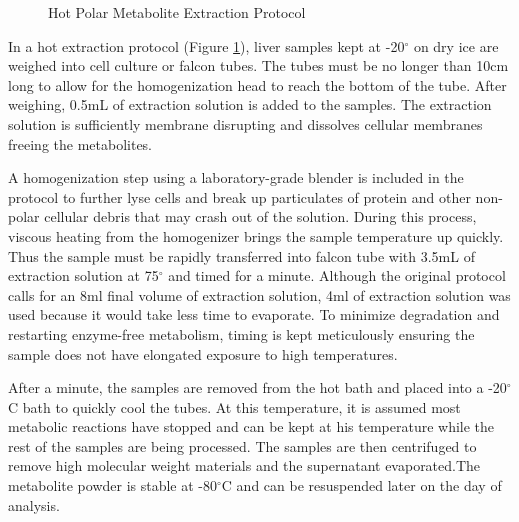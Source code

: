 \documentclass[a4paper,11pt,twoside]{book}
\begin{document}
	\begin{figure}[b!ht]
		\centering
		\caption{Hot Polar Metabolite Extraction Protocol}
		\label{fig:Hot Extraction Protocol}
	\end{figure}
	
	
	In a hot extraction protocol (Figure \ref{fig:Hot Extraction Protocol}), liver samples kept at -20$^{\circ}$ on dry ice are weighed into cell culture or falcon tubes. The tubes must be no longer than 10cm long to allow for the homogenization head to reach the bottom of the tube. After weighing, 0.5mL of extraction solution is added to the samples. The extraction solution is sufficiently membrane disrupting and dissolves cellular membranes freeing the metabolites. 
	
	A homogenization step using a laboratory-grade blender is included in the protocol to further lyse cells and break up particulates of protein and other non-polar cellular debris that may crash out of the solution. During this process, viscous heating from the homogenizer brings the sample temperature up quickly. Thus the sample must be rapidly transferred into falcon tube with 3.5mL of extraction solution at 75$^{\circ}$ and timed for a minute. Although the original protocol calls for an 8ml final volume of extraction solution, 4ml of extraction solution was used because it would take less time to evaporate. To minimize degradation and restarting enzyme-free metabolism, timing is kept meticulously ensuring the sample does not have elongated exposure to high temperatures. 
	
	After a minute, the samples are removed from the hot bath and placed into a -20$^{\circ}$C bath to quickly cool the tubes. At this temperature, it is assumed most metabolic reactions have stopped and can be kept at his temperature while the rest of the samples are being processed. The samples are then centrifuged to remove high molecular weight materials and the supernatant evaporated.The metabolite powder is stable at -80$^\circ$C and can be resuspended later on the day of analysis.
	
\end{document}
